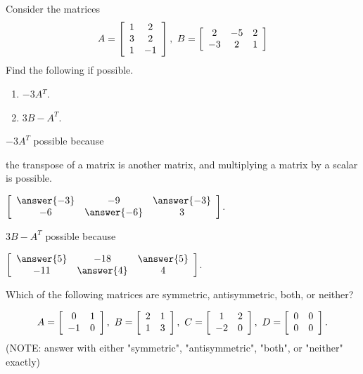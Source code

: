 \documentclass{ximera}
\author{Zack Reed}
\begin{document}
\begin{exercise}
  Consider the matrices
  \begin{equation*}
    A = \startmat{cc}
      1 & 2 \\
      3 & 2 \\
      1 & -1
    \stopmat,
    \quad
    B = \startmat{ccc}
      2 & -5 & 2 \\
      -3 & 2 & 1
    \stopmat
  \end{equation*}
  Find the following if possible.
  \begin{enumerate}
  \item $-3A{^T}$.
  \item $3B - A^T$.
  \end{enumerate}

  $-3A^T$  possible because

  \begin{problem}
    the transpose of a matrix is another matrix, and multiplying a matrix by a scalar is possible.


$\startmat{ccc}
        \answer{-3} & -9 & \answer{-3} \\
        -6 & \answer{-6} & 3
      \stopmat$.
\end{problem}

$3B - A^T$  possible because

  \begin{problem}
\begin{selectAll}
\end{selectAll}

$\startmat{ccc}
        \answer{5} & -18 & \answer{5} \\
        -11 & \answer{4} & 4
      \stopmat$.
      \end{problem}



  Which of the following matrices are symmetric, antisymmetric, both,
  or neither?

  \begin{equation*}
    A = \startmat{cc}
      0 & 1 \\
      -1 & 0
    \stopmat,
    \quad
    B = \startmat{cc}
      2 & 1 \\
      1 & 3
    \stopmat,
    \quad
    C = \startmat{cc}
      1 & 2 \\
      -2 & 0
    \stopmat,
    \quad
    D = \startmat{cc}
      0 & 0 \\
      0 & 0
    \stopmat.
  \end{equation*}
  (NOTE: answer with either "symmetric", "antisymmetric", "both", or "neither" exactly)


\end{exercise}
\end{document}
